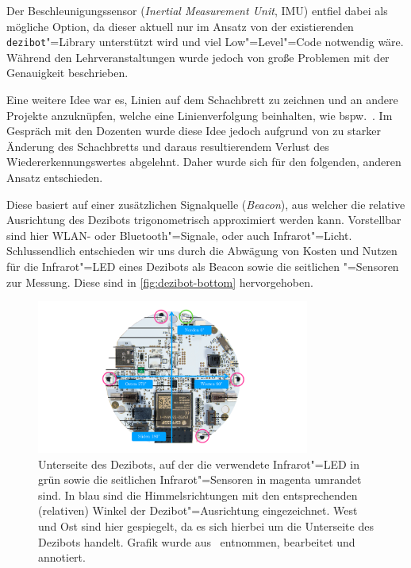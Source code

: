 Der Beschleunigungssensor (\emph{Inertial Measurement Unit}, IMU) entfiel dabei als mögliche Option, da dieser aktuell nur im Ansatz von der existierenden \texttt{dezibot}"=Library unterstützt wird und viel Low"=Level"=Code notwendig wäre. Während den Lehrveranstaltungen wurde jedoch von große Problemen mit der Genauigkeit beschrieben.

Eine weitere Idee war es, Linien auf dem Schachbrett zu zeichnen und an andere Projekte anzuknüpfen, welche eine Linienverfolgung beinhalten, wie bspw.~\cite{antonovSnskorpion2DezibotLabyrinthSolver2025}. Im Gespräch mit den Dozenten wurde diese Idee jedoch aufgrund von zu starker Änderung des Schachbretts und daraus resultierendem Verlust des Wiedererkennungswertes abgelehnt. Daher wurde sich für den folgenden, anderen Ansatz entschieden.

Diese basiert auf einer zusätzlichen Signalquelle (\emph{Beacon}), aus welcher die relative Ausrichtung des Dezibots trigonometrisch approximiert werden kann. Vorstellbar sind hier WLAN- oder Bluetooth"=Signale, oder auch Infrarot"=Licht. Schlussendlich entschieden wir uns durch die Abwägung von Kosten und Nutzen für die Infrarot"=LED eines Dezibots als Beacon sowie die seitlichen "=Sensoren zur Messung. Diese sind in \autoref{fig:dezibot-bottom} hervorgehoben.

\begin{figure}[h]
    \centering
    \includegraphics[width=0.8\textwidth]{../assets/dezibot_bottom.pdf}
    \caption{Unterseite des Dezibots, auf der die verwendete Infrarot"=LED in grün sowie die seitlichen Infrarot"=Sensoren in magenta umrandet sind. In blau sind die Himmelsrichtungen mit den entsprechenden (relativen) Winkel der Dezibot"=Ausrichtung eingezeichnet. West und Ost sind hier gespiegelt, da es sich hierbei um die Unterseite des Dezibots handelt. Grafik wurde aus~\cite{fingerleDokumentationDezibot42025} entnommen, bearbeitet und annotiert.}
    \label{fig:dezibot-bottom}
\end{figure}

